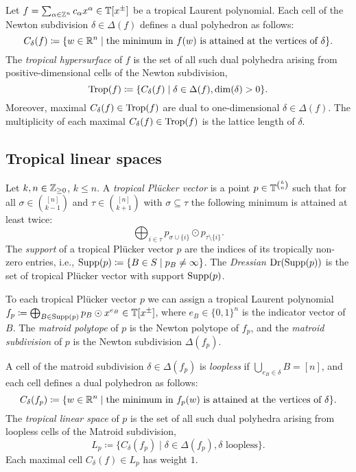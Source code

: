 \begin{definition}
  Let $f=\sum_{\alpha\in\mathbb{Z}^n}c_\alpha x^\alpha\in\mathbb{T}[x^\pm]$ be a tropical Laurent polynomial. Each cell of the Newton subdivision $\delta\in\Delta(f)$ defines a dual polyhedron as follows:
  \[ C_\delta(f)\coloneqq \{ w\in\mathbb{R}^n\mid \text{the minimum in } f(w) \text{ is attained at the vertices of } \delta \}. \]
  The \emph{tropical hypersurface} of $f$ is the set of all such dual polyhedra arising from positive-dimensional cells of the Newton subdivision,
  \[ \operatorname{Trop}(f)\coloneqq \{C_\delta(f)\mid \delta\in\Delta(f), \dim(\delta)>0 \}. \]
  Moreover, maximal $C_\delta(f)\in\operatorname{Trop}(f)$ are dual to one-dimensional $\delta\in\Delta(f)$.  The multiplicity of each maximal $C_\delta(f)\in\operatorname{Trop}(f)$ is the lattice length of $\delta$.
\end{definition}

\begin{example}

\end{example}

\subsection{Tropical linear spaces}

\begin{definition}
  Let $k,n\in\mathbb{Z}_{\geq 0}$, $k\leq n$.  A \emph{tropical Pl\"ucker vector} is a point $p\in \mathbb{T}^{\binom{k}{n}}$ such that for all $\sigma\in\binom{[n]}{k-1}$ and $\tau\in\binom{[n]}{k+1}$ with $\sigma\subseteq\tau$ the following minimum is attained at least twice:
  \[ \bigoplus_{i\in\tau} p_{\sigma\cup\{i\}}\odot p_{\tau\setminus\{i\}}. \]
  The \emph{support} of a tropical Pl\"ucker vector $p$ are the indices of its tropically non-zero entries, i.e., $\operatorname{Supp}(p)\coloneqq\{ B\in S\mid p_B\neq\infty\}$. The \emph{Dressian} $\operatorname{Dr}(\operatorname{Supp}(p))$ is the set of tropical Pl\"ucker vector with support $\operatorname{Supp}(p)$.


  To each tropical Pl\"ucker vector $p$ we can assign a tropical Laurent polynomial $f_p\coloneqq \bigoplus_{B\in \operatorname{Supp}(p)} p_B\odot x^{e_B}\in\mathbb{T}[x^\pm]$, where $e_B\in\{0,1\}^n$ is the indicator vector of $B$.  The \emph{matroid polytope} of $p$ is the Newton polytope of $f_p$, and the \emph{matroid subdivision} of $p$ is the Newton subdivision $\Delta(f_p)$.

\end{definition}

\begin{definition}
  A cell of the matroid subdivision $\delta\in\Delta(f_p)$ is \emph{loopless} if $\bigcup_{e_B\in\delta}B=[n]$, and each cell defines a dual polyhedron as follows:
  \[ C_\delta(f_p)\coloneqq \{ w\in\mathbb{R}^n\mid \text{the minimum in } f_p(w) \text{ is attained at the vertices of } \delta \}. \]
  The \emph{tropical linear space} of $p$ is the set of all such dual polyhedra arising from loopless cells of the Matroid subdivision,
  \[ L_p\coloneqq \{C_\delta(f_p)\mid \delta\in\Delta(f_p), \delta \text{ loopless} \}. \]
  Each maximal cell $C_\delta(f)\in L_p$ has weight $1$.
\end{definition}


